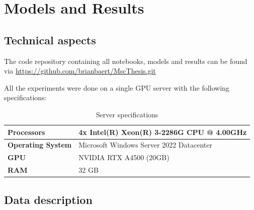 \chapter{Models and Results}
\label{chap:models_and_results}
\section{Technical aspects}
The code repository containing all notebooks, models and results can be found via \newline \url{https://github.com/brianbaert/MscThesis.git} 


All the experiments were done on a single GPU server with the following specifications:
\begin{table}[H]
\centering
\begin{tabular}{|l|l|}
\hline
\textbf{Processors} & 4x Intel(R) Xeon(R) 3-2286G CPU @ 4.00GHz \\
\hline
\textbf{Operating System} & Microsoft Windows Server 2022 Datacenter \\
\hline
\textbf{GPU} & NVIDIA RTX A4500 (20GB) \\
\hline
\textbf{RAM} & 32 GB \\
\hline
\end{tabular}
\label{tbl:specifications}
\caption{Server specifications}
\end{table}

\section{Data description}
\label{sec-DataDesc}
